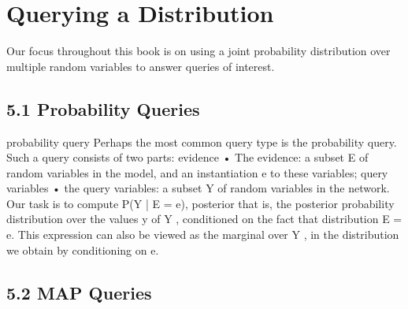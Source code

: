 \section{Querying a Distribution}

Our focus throughout this book is on using a joint probability distribution over multiple random variables to answer queries of interest.

\subsection{5.1 Probability Queries}

probability query Perhaps the most common query type is the probability query. Such a query consists of two parts: evidence • The evidence: a subset E of random variables in the model, and an instantiation e to these variables; query variables • the query variables: a subset Y of random variables in the network. Our task is to compute P(Y | E = e), posterior that is, the posterior probability distribution over the values y of Y , conditioned on the fact that distribution E = e. This expression can also be viewed as the marginal over Y , in the distribution we obtain by conditioning on e.

\subsection{5.2 MAP Queries}

